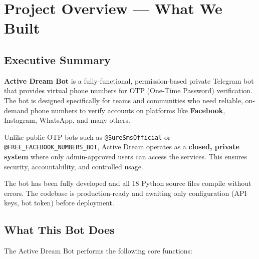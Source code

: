 
\chapter{Project Overview — What We Built}

\section{Executive Summary}

\textbf{Active Dream Bot} is a fully-functional, permission-based private Telegram bot that provides virtual phone numbers for OTP (One-Time Password) verification. The bot is designed specifically for teams and communities who need reliable, on-demand phone numbers to verify accounts on platforms like \textbf{Facebook}, Instagram, WhatsApp, and many others.

Unlike public OTP bots such as \texttt{@SureSmsOfficial} or \texttt{@FREE\_FACEBOOK\_NUMBERS\_BOT}, Active Dream operates as a \textbf{closed, private system} where only admin-approved users can access the services. This ensures security, accountability, and controlled usage.

\begin{successbox}
The bot has been fully developed and all 18 Python source files compile without errors. The codebase is production-ready and awaiting only configuration (API keys, bot token) before deployment.
\end{successbox}

\section{What This Bot Does}

The Active Dream Bot performs the following core functions:

